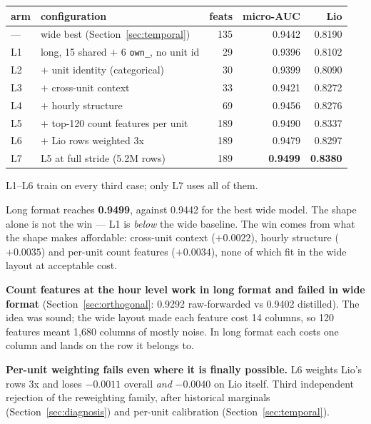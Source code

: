 \begin{center}\small
\begin{tabular}{llrrr}
\toprule
arm & configuration & feats & micro-AUC & Lio \\
\midrule
--- & wide best (Section~\ref{sec:temporal}) & 135 & 0.9442 & 0.8190 \\
\midrule
L1 & long, 15 shared $+$ 6 \texttt{own\_}, no unit id & 29  & 0.9396 & 0.8102 \\
L2 & $+$ unit identity (categorical)                  & 30  & 0.9399 & 0.8090 \\
L3 & $+$ cross-unit context                           & 33  & 0.9421 & 0.8272 \\
L4 & $+$ hourly structure                             & 69  & 0.9456 & 0.8276 \\
L5 & $+$ top-120 count features per unit              & 189 & 0.9490 & 0.8337 \\
L6 & $+$ Lio rows weighted 3x                         & 189 & 0.9479 & 0.8297 \\
L7 & L5 at full stride (5.2M rows)                    & 189 & \textbf{0.9499} & \textbf{0.8380} \\
\bottomrule
\end{tabular}
\end{center}

L1--L6 train on every third case; only L7 uses all of them.

\begin{finding}
Long format reaches \textbf{0.9499}, against 0.9442 for the best wide model. The shape alone is
not the win --- L1 is \emph{below} the wide baseline. The win comes from what the shape makes
affordable: cross-unit context ($+0.0022$), hourly structure ($+0.0035$) and per-unit count
features ($+0.0034$), none of which fit in the wide layout at acceptable cost.
\end{finding}

\begin{finding}
\textbf{Count features at the hour level work in long format and failed in wide format}
(Section~\ref{sec:orthogonal}: 0.9292 raw-forwarded vs 0.9402 distilled). The idea was sound; the
wide layout made each feature cost 14 columns, so 120 features meant 1{,}680 columns of mostly
noise. In long format each costs one column and lands on the row it belongs to.
\end{finding}

\begin{finding}
\textbf{Per-unit weighting fails even where it is finally possible.} L6 weights Lio's rows 3x and
loses $-0.0011$ overall \emph{and} $-0.0040$ on Lio itself. Third independent rejection of the
reweighting family, after historical marginals (Section~\ref{sec:diagnosis}) and per-unit
calibration (Section~\ref{sec:temporal}).
\end{finding}

